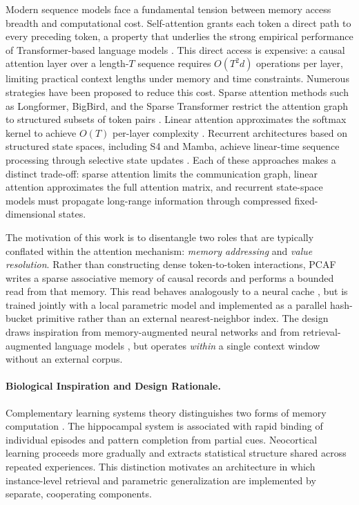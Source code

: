 \documentclass{article}
\begin{document}
Modern sequence models face a fundamental tension between memory access breadth
and computational cost. Self-attention grants each token a direct path to every
preceding token, a property that underlies the strong empirical performance of
Transformer-based language models
\citep{vaswani2017attention,bahdanau2015attention}. This direct access is
expensive: a causal attention layer over a length-$T$ sequence requires
$O(T^2 d)$ operations per layer, limiting practical context lengths under
memory and time constraints. Numerous strategies have been proposed to reduce
this cost. Sparse attention methods such as Longformer, BigBird, and the Sparse
Transformer restrict the attention graph to structured subsets of token pairs
\citep{beltagy2020longformer,zaheer2020bigbird,child2019sparsetransformer}.
Linear attention approximates the softmax kernel to achieve $O(T)$ per-layer
complexity \citep{katharopoulos2020linearattn}. Recurrent architectures based
on structured state spaces, including S4 and Mamba, achieve linear-time
sequence processing through selective state updates
\citep{gu2021s4,gu2023mamba}. Each of these approaches makes a distinct
trade-off: sparse attention limits the communication graph, linear attention
approximates the full attention matrix, and recurrent state-space models must
propagate long-range information through compressed fixed-dimensional states.

The motivation of this work is to disentangle two roles that are typically
conflated within the attention mechanism: \emph{memory addressing} and
\emph{value resolution}. Rather than constructing dense token-to-token
interactions, PCAF writes a sparse associative memory of causal records and
performs a bounded read from that memory. This read behaves analogously to a
neural cache \citep{grave2016continuous,khandelwal2019knn}, but is trained
jointly with a local parametric model and implemented as a parallel hash-bucket
primitive rather than an external nearest-neighbor index. The design draws
inspiration from memory-augmented neural networks
\citep{weston2015memory,sukhbaatar2015end2end} and from retrieval-augmented
language models \citep{borgeaud2022retro,izacard2022atlas}, but operates
\emph{within} a single context window without an external corpus.

\paragraph{Biological Inspiration and Design Rationale.}
Complementary learning systems theory distinguishes two forms of memory
computation \citep{mcclelland1995complementary,kumaran2016learning}. The
hippocampal system is associated with rapid binding of individual episodes and
pattern completion from partial cues. Neocortical learning proceeds more
gradually and extracts statistical structure shared across repeated
experiences. This distinction motivates an architecture in which instance-level
retrieval and parametric generalization are implemented by separate,
cooperating components.
\end{document}
